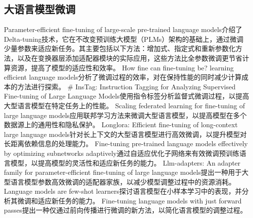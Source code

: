 \documentclass[a4paper,AutoFakeBold,oneside,12pt]{book}
\begin{document}
\subsection{大语言模型微调}
Parameter-efficient fine-tuning of large-scale pre-trained language models\cite{ding2023parameter}介绍了Delta-tuning技术，它在不改变预训练大模型（PLMs）架构的基础上，通过微调少量参数来适应新任务。其主要包括以下方法：增加式、指定式和重新参数化方法，以及在变换器层添加适配器模块的实际应用，这些方法比全参数微调更节省计算资源，提高了模型的适应性和效率。
How fine can fine-tuning be? learning efficient language models\cite{radiya2020fine}分析了微调过程的效率，对在保持性能的同时减少计算成本的方法进行探索。
\# InsTag: Instruction Tagging for Analyzing Supervised Fine-tuning of Large Language Models\cite{lu2023instag}使用指令标签分析监督式微调过程，以提高大型语言模型在特定任务上的性能。
Scaling federated learning for fine-tuning of large language models\cite{hilmkil2021scaling}应用联邦学习方法来微调大型语言模型，以提高模型在多个数据源上的通用性和隐私保护。
Longlora: Efficient fine-tuning of long-context large language models\cite{chen2023longlora}针对长上下文的大型语言模型进行高效微调，以提升模型对长距离依赖信息的处理能力。
Fine-tuning pre-trained language models effectively by optimizing subnetworks adaptively\cite{zhang2022fine}通过自适应优化子网络来有效微调预训练语言模型，以提高模型的灵活性和适应新任务的能力。
Llm-adapters: An adapter family for parameter-efficient fine-tuning of large language models\cite{hu2023llm}提出一种用于大型语言模型参数高效微调的适配器家族，以减少模型调整过程中的资源消耗。
Language models are few-shot learners\cite{brown2020language}探讨语言模型在小样本学习中的表现，并分析其微调和适应新任务的能力。
Fine-tuning language models with just forward passes\cite{malladi2024fine}提出一种仅通过前向传播进行微调的新方法，以简化语言模型的调整过程。
\end{document}
